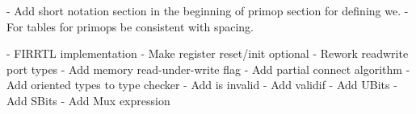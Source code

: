 \documentclass[12pt]{article}
\begin{document}
- Add short notation section in the beginning of primop section for defining we.
- For tables for primops be consistent with spacing.

- FIRRTL implementation
   - Make register reset/init optional
   - Rework readwrite port types
   - Add memory read-under-write flag
   - Add partial connect algorithm
   - Add oriented types to type checker
   - Add is invalid
   - Add validif
   - Add UBits
   - Add SBits
   - Add Mux expression

%

\end{document}
